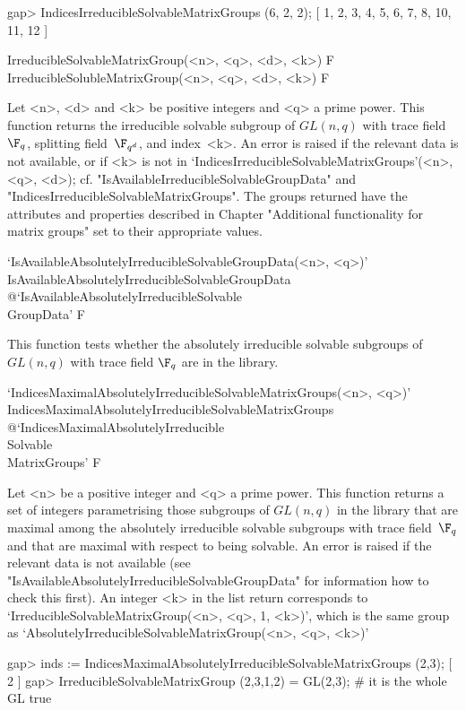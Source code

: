 \beginexample
gap> IndicesIrreducibleSolvableMatrixGroups (6, 2, 2);
[ 1, 2, 3, 4, 5, 6, 7, 8, 10, 11, 12 ]
\endexample

\>IrreducibleSolvableMatrixGroup(<n>, <q>, <d>, <k>) F
\>IrreducibleSolubleMatrixGroup(<n>, <q>, <d>, <k>) F

Let <n>, <d> and <k> be  positive integers and <q> a prime power. This
function returns the irreducible solvable subgroup of $GL(n,q)$ with trace field $\F_q$, 
splitting field~$\F_{q^d}$, and index~<k>.
An error is raised if the relevant
data is not available, or if <k> is not in  
`IndicesIrreducibleSolvableMatrixGroups'(<n>, <q>, <d>); cf. "IsAvailableIrreducibleSolvableGroupData" and "IndicesIrreducibleSolvableMatrixGroups".
The groups returned have the attributes and properties described in
Chapter "Additional functionality for matrix groups" set to their appropriate values.


\>`IsAvailableAbsolutelyIrreducibleSolvableGroupData(<n>, <q>)'%
{IsAvailableAbsolutelyIrreducibleSolvableGroupData}%
@{`IsAvailableAbsolutelyIrreducibleSolvable\\GroupData'} F

This function tests whether the
absolutely irreducible solvable subgroups of $GL(n,q)$ with trace field $\F_q$ are in the {\IRREDSOL} library.




\>`IndicesMaximalAbsolutelyIrreducibleSolvableMatrixGroups(<n>, <q>)'%
{IndicesMaximalAbsolutelyIrreducibleSolvableMatrixGroups}%
@{`IndicesMaximalAbsolutelyIrreducible\\Solvable\\MatrixGroups'} F

Let <n> be a  positive integer and <q> a prime power. This
function returns a set of integers parametrising those subgroups of $GL(n, q)$ in the
{\IRREDSOL} library that are maximal among the absolutely irreducible solvable subgroups with  trace field~$\F_q $ and that are maximal with
respect to being solvable. An error is raised if the relevant
data is not available (see "IsAvailableAbsolutelyIrreducibleSolvableGroupData" for information 
how to check this first). An integer <k> in the list return corresponds to `IrreducibleSolvableMatrixGroup(<n>, <q>, 1, <k>)', which is the same group as
`AbsolutelyIrreducibleSolvableMatrixGroup(<n>, <q>, <k>)'

\beginexample
gap> inds := IndicesMaximalAbsolutelyIrreducibleSolvableMatrixGroups (2,3);
[ 2 ] 
gap> IrreducibleSolvableMatrixGroup (2,3,1,2) = GL(2,3); # it is the whole GL
true
\endexample


